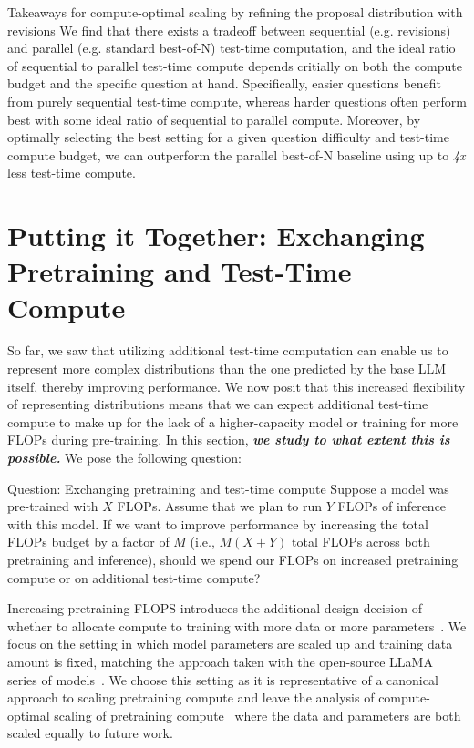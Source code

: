 \begin{AIbox}{Takeaways for compute-optimal scaling by refining the proposal distribution with revisions}
We find that there exists a tradeoff between sequential (e.g. revisions) and parallel (e.g. standard best-of-N) test-time computation, and the ideal ratio of sequential to parallel test-time compute depends critially on both the compute budget and the specific question at hand. Specifically, easier questions benefit from purely sequential test-time compute, whereas harder questions often perform best with some ideal ratio of sequential to parallel compute. Moreover, by optimally selecting the best setting for a given question difficulty and test-time compute budget, we can outperform the parallel best-of-N baseline using up to \emph{4x} less test-time compute.
\end{AIbox}

\vspace{-0.25cm}
\section{Putting it Together: Exchanging Pretraining and Test-Time Compute}
\label{sec:exchanging}
\vspace{-0.2cm}
So far, we saw that utilizing additional test-time computation can enable us to represent more complex distributions than the one predicted by the base LLM itself, thereby improving performance. We now posit that this increased flexibility of representing distributions means that we can expect additional test-time compute to make up for the lack of a higher-capacity model or training for more FLOPs during pre-training. In this section, \emph{\textbf{we study to what extent this is possible.}} We pose the following question:

\begin{AIbox}{Question: Exchanging pretraining and test-time compute}
    Suppose a model was pre-trained with $X$ FLOPs. Assume that we plan to run $Y$ FLOPs of inference with this model. If we want to improve performance by increasing the total FLOPs budget by a factor of $M$ (i.e., $M(X+Y)$ total FLOPs across both pretraining and inference), should we spend our FLOPs on increased pretraining compute or on additional test-time compute?
\end{AIbox}
Increasing pretraining FLOPS introduces the additional design decision of whether to allocate compute to training with more data or more parameters~\citep{hoffmann2022training}. We focus on the setting in which model parameters are scaled up and training data amount is fixed, matching the approach taken with the open-source LLaMA series of models~\citep{touvron2023llama2openfoundation}. We choose this setting as it is representative of a canonical approach to scaling pretraining compute and leave the analysis of compute-optimal scaling of pretraining compute~\citep{sardana2023chinchillaoptimal} where the data and parameters are both scaled equally to future work.

